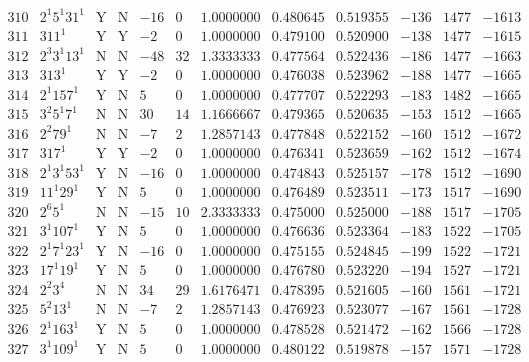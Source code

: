 \documentclass[11pt,reqno,a4letter]{article}
\numberwithin{figure}{section}
\numberwithin{table}{section}
\theoremstyle{plain}
\numberwithin{theorem}{section}
\theoremstyle{definition}
\begin{document}
\begin{table}[ht]
\begin{equation*}
{\begin{array}{cc|cc|ccc|cc|ccc}
 310 & 2^1 5^1 31^1 & \text{Y} & \text{N} & -16 & 0 & 1.0000000 & 0.480645 & 0.519355 & -136 & 1477 & -1613 \\
 311 & 311^1 & \text{Y} & \text{Y} & -2 & 0 & 1.0000000 & 0.479100 & 0.520900 & -138 & 1477 & -1615 \\
 312 & 2^3 3^1 13^1 & \text{N} & \text{N} & -48 & 32 & 1.3333333 & 0.477564 & 0.522436 & -186 & 1477 & -1663 \\
 313 & 313^1 & \text{Y} & \text{Y} & -2 & 0 & 1.0000000 & 0.476038 & 0.523962 & -188 & 1477 & -1665 \\
 314 & 2^1 157^1 & \text{Y} & \text{N} & 5 & 0 & 1.0000000 & 0.477707 & 0.522293 & -183 & 1482 & -1665 \\
 315 & 3^2 5^1 7^1 & \text{N} & \text{N} & 30 & 14 & 1.1666667 & 0.479365 & 0.520635 & -153 & 1512 & -1665 \\
 316 & 2^2 79^1 & \text{N} & \text{N} & -7 & 2 & 1.2857143 & 0.477848 & 0.522152 & -160 & 1512 & -1672 \\
 317 & 317^1 & \text{Y} & \text{Y} & -2 & 0 & 1.0000000 & 0.476341 & 0.523659 & -162 & 1512 & -1674 \\
 318 & 2^1 3^1 53^1 & \text{Y} & \text{N} & -16 & 0 & 1.0000000 & 0.474843 & 0.525157 & -178 & 1512 & -1690 \\
 319 & 11^1 29^1 & \text{Y} & \text{N} & 5 & 0 & 1.0000000 & 0.476489 & 0.523511 & -173 & 1517 & -1690 \\
 320 & 2^6 5^1 & \text{N} & \text{N} & -15 & 10 & 2.3333333 & 0.475000 & 0.525000 & -188 & 1517 & -1705 \\
 321 & 3^1 107^1 & \text{Y} & \text{N} & 5 & 0 & 1.0000000 & 0.476636 & 0.523364 & -183 & 1522 & -1705 \\
 322 & 2^1 7^1 23^1 & \text{Y} & \text{N} & -16 & 0 & 1.0000000 & 0.475155 & 0.524845 & -199 & 1522 & -1721 \\
 323 & 17^1 19^1 & \text{Y} & \text{N} & 5 & 0 & 1.0000000 & 0.476780 & 0.523220 & -194 & 1527 & -1721 \\
 324 & 2^2 3^4 & \text{N} & \text{N} & 34 & 29 & 1.6176471 & 0.478395 & 0.521605 & -160 & 1561 & -1721 \\
 325 & 5^2 13^1 & \text{N} & \text{N} & -7 & 2 & 1.2857143 & 0.476923 & 0.523077 & -167 & 1561 & -1728 \\
 326 & 2^1 163^1 & \text{Y} & \text{N} & 5 & 0 & 1.0000000 & 0.478528 & 0.521472 & -162 & 1566 & -1728 \\
 327 & 3^1 109^1 & \text{Y} & \text{N} & 5 & 0 & 1.0000000 & 0.480122 & 0.519878 & -157 & 1571 & -1728 \\

\end{array}}
\end{equation*}
\end{table}
\end{document}

